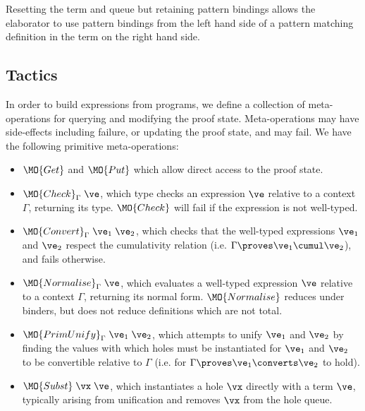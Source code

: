 \DM{
(\vC, \Delta, \hole{\vx}{\vt}\SC\vx, \langle\rangle, \langle\vx\rangle)
}

Resetting the term and queue but retaining pattern bindings
allows the elaborator to use pattern bindings from the left
hand side of a pattern matching definition in the term on the right hand side.


\renewcommand{\Check}{\MO{Check}_\Gamma}
\newcommand{\Eval}{\MO{Normalise}_\Gamma}
\newcommand{\Unify}{\MO{Unify}_\Gamma}
\newcommand{\PrimUnify}{\MO{PrimUnify}_\Gamma}
\newcommand{\Subst}{\MO{Subst}}

\subsection{Tactics}

In order to build \TT{} expressions from \Idris{} programs, we define a collection
of meta-operations for querying and modifying the proof state. Meta-operations
may have side-effects including failure, or updating the proof state, and
may fail. We have the following primitive meta-operations:

\begin{itemize}
\item $\MO{Get}$ and $\MO{Put}$ which allow direct access to the proof state.
\item $\Check\;\ve$, which type checks an expression $\ve$ relative to a context
$\Gamma$, returning its type.
$\MO{Check}$ will fail
if the expression is not well-typed.
\item $\MO{Convert}_\Gamma\;\ve_1\;\ve_2$, which checks that the well-typed
expressions $\ve_1$ and $\ve_2$ respect the cumulativity relation 
(i.e. $\Gamma\proves\ve_1\cumul\ve_2$), and fails otherwise.
\item $\Eval\;\ve$, which evaluates a well-typed expression $\ve$ relative to a context 
$\Gamma$, returning its normal form. $\MO{Normalise}$ reduces under binders,
but does not reduce definitions which are not total.
\item 
$\PrimUnify\;\ve_1\;\ve_2$, 
which attempts to unify $\ve_1$ and $\ve_2$ by finding the values with which
holes must be instantiated for $\ve_1$ and $\ve_2$ to be convertible relative
to $\Gamma$ (i.e. for $\Gamma\proves\ve_1\converts\ve_2$ to hold).
\item $\Subst\;\vx\;\ve$, which instantiates a hole $\vx$ directly with a term
$\ve$, typically arising from unification and removes $\vx$ from the hole
queue.
\end{itemize}

